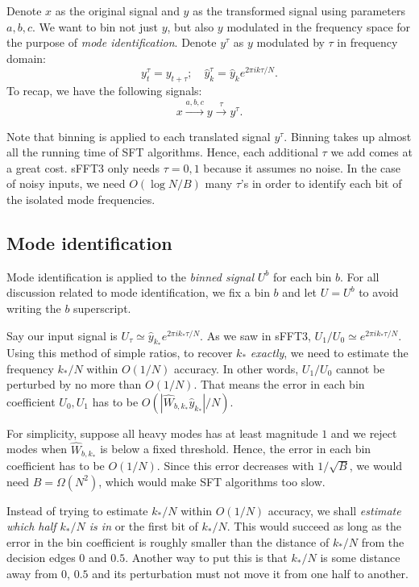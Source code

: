 \documentclass[10pt]{article}
\begin{document}
Denote $x$ as the original signal and $y$ as the transformed signal using parameters $a,b,c$. We want to bin not just $y$, but also $y$ modulated in the frequency space for the purpose of \emph{mode identification}. Denote $y^{\tau}$ as $y$ modulated by $\tau$ in frequency domain:
$$y^{\tau}_{t} = y_{t+\tau}; \quad \hat{y}^{\tau}_k = \hat{y}_k e^{2\pi i k \tau/N}.$$
To recap, we have the following signals:
$$x \xrightarrow{a,b,c} y \xrightarrow{\tau} y^{\tau}.$$

Note that binning is applied to each translated signal $y^{\tau}$. Binning takes up almost all the running time of SFT algorithms. Hence, each additional $\tau$ we add comes at a great cost. sFFT3 only needs $\tau=0,1$ because it assumes no noise. In the case of noisy inputs, we need $O(\log N/B)$ many $\tau$'s in order to identify each bit of the isolated mode frequencies.

\subsection{Mode identification}

Mode identification is applied to the \emph{binned signal} $U^b$ for each bin $b$. For all discussion related to mode identification, we fix a bin $b$ and let $U=U^b$ to avoid writing the $b$ superscript.

Say our input signal is $U_{\tau} \simeq \hat{y}_{k_*} e^{2\pi i k_* \tau/N}$. As we saw in sFFT3, $U_1/U_0 \simeq e^{2\pi i k_* \tau/N}$. Using this method of simple ratios, to recover $k_*$ \emph{exactly}, we need to estimate the frequency $k_*/N$ within $O(1/N)$ accuracy. In other words, $U_1/U_0$ cannot be perturbed by no more than $O(1/N)$. That means the error in each bin coefficient $U_0,U_1$ has to be $O(|\hat{W}_{b,k_*}\hat{y}_{k_*}|/N)$.

For simplicity, suppose all heavy modes has at least magnitude $1$ and we reject modes when $\hat{W}_{b,k_*}$ is below a fixed threshold. Hence, the error in each bin coefficient has to be $O(1/N)$. Since this error decreases with $1/\sqrt{B}$, we would need $B=\Omega(N^2)$, which would make SFT algorithms too slow.

Instead of trying to estimate $k_*/N$ within $O(1/N)$ accuracy, we shall \emph{estimate which half $k_*/N$ is in} or the first bit of $k_*/N$. This would succeed as long as the error in the bin coefficient is roughly smaller than the distance of $k_*/N$ from the decision edges $0$ and $0.5$. Another way to put this is that $k_*/N$ is some distance away from $0$, $0.5$ and its perturbation must not move it from one half to another.
\end{document}
